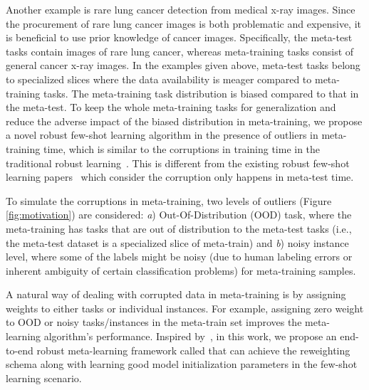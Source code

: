 Another example is rare lung cancer detection from medical x-ray images. Since the procurement of rare lung cancer images is both problematic and expensive, it is beneficial to use prior knowledge of cancer images. Specifically, the meta-test tasks contain images of rare lung cancer, whereas meta-training tasks consist of general cancer x-ray images. In the examples given above, meta-test tasks belong to specialized slices where the data availability is meager compared to meta-training tasks. The meta-training task distribution is biased compared to that in the meta-test. To keep the whole meta-training tasks for generalization and reduce the adverse impact of the biased distribution in meta-training, we propose a novel robust few-shot learning algorithm in the presence of outliers in meta-training time, which is similar to the corruptions in training time in the traditional robust learning~\citep{schneider2020improving}. This is different from the existing robust few-shot learning papers~\cite{yin2018adversarial, lu2020robust, goldblum2020adversarially} which consider the corruption only happens in meta-test time.     

To simulate the corruptions in meta-training, two levels of outliers (Figure \ref{fig:motivation}) are considered: {\textit{a}}) Out-Of-Distribution (OOD) task, where the meta-training has tasks that are out of distribution to the meta-test tasks (i.e., the meta-test dataset is a specialized slice of meta-train) and {\textit{b}}) noisy instance level, where some of the labels might be noisy (due to human labeling errors or inherent ambiguity of certain classification problems) for meta-training samples. 

A natural way of dealing with corrupted data in meta-training is by assigning weights to either tasks or individual instances. For example, assigning zero weight to OOD or noisy tasks/instances in the meta-train set improves the meta-learning algorithm's performance. Inspired by~\citep{ren2018learning}, in this work, we propose an end-to-end robust meta-learning framework called \sysname{} that can achieve the reweighting schema along with learning good model initialization parameters in the few-shot learning scenario.  



